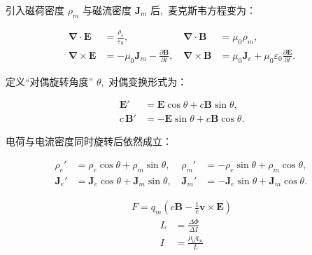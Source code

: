 引入磁荷密度 $\rho_m$ 与磁流密度 $\boldsymbol{J}_m$ 后, \,麦克斯韦方程变为：

\begin{align*}
\boldsymbol\nabla \cdot \boldsymbol{E} &= \frac{\rho_e}{\varepsilon_0}, \,&
\boldsymbol\nabla \cdot \boldsymbol{B} &= \mu_0 \rho_m, \,\\
\boldsymbol\nabla \times \boldsymbol{E} &= -\mu_0 \boldsymbol{J}_m - \frac{\partial \boldsymbol{B}}{\partial t}, \,&
\boldsymbol\nabla \times \boldsymbol{B} &= \mu_0 \boldsymbol{J}_e + \mu_0 \varepsilon_0 \frac{\partial \boldsymbol{E}}{\partial t}.
\end{align*}


定义“对偶旋转角度” $\theta$, \,对偶变换形式为：

\begin{align*}
\boldsymbol{E}' &= \boldsymbol{E} \cos\theta + c \boldsymbol{B} \sin\theta, \,\\
c\,\boldsymbol{B}' &= -\boldsymbol{E} \sin\theta + c \boldsymbol{B} \cos\theta.
\end{align*}

电荷与电流密度同时旋转后依然成立：

\begin{align*}
\rho_e' &= \rho_e \cos\theta + \rho_m \sin\theta, \,&
\rho_m' &= -\rho_e \sin\theta + \rho_m \cos\theta, \,\\
\boldsymbol{J}_e' &= \boldsymbol{J}_e \cos\theta + \boldsymbol{J}_m \sin\theta, \,&
\boldsymbol{J}_m' &= -\boldsymbol{J}_e \sin\theta + \boldsymbol{J}_m \cos\theta.
\end{align*}

\begin{align*}
    F=q_m(c\boldsymbol{B}-\frac1c\boldsymbol v\times\boldsymbol{E})
\end{align*}
\begin{align*}
    L&=\frac{\Delta \Phi}{\Delta I}\\
    I&=\frac{\mu_0 q_m}{L}
\end{align*}
